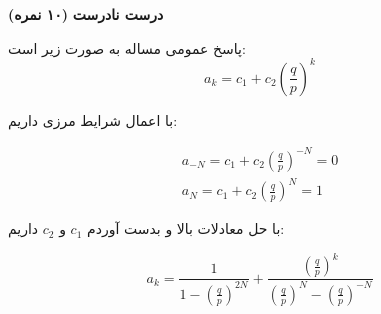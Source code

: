 \Large \textbf{درست نادرست}
\large \textbf{(۱۰ نمره)}

\normalsize \vspace{0.5cm}

پاسخ عمومی مساله به صورت زیر است:
$$
{a_k} = {c_1} + {c_2}{\left( {\frac{q}{p}} \right)^k}
$$

با اعمال شرایط مرزی داریم:

$$
\begin{array}{l}
	{a_{ - N}} = {c_1} + {c_2}{\left( {\frac{q}{p}} \right)^{ - N}} = 0\\
	{a_N} = {c_1} + {c_2}{\left( {\frac{q}{p}} \right)^N} = 1
\end{array}
$$

با حل معادلات بالا و بدست آوردم
${c_1}$
و
${c_2}$
داریم:

$$
{a_k} = \frac{1}{{1 - {{\left( {\frac{q}{p}} \right)}^{2N}}}} + \frac{{{{\left( {\frac{q}{p}} \right)}^k}}}{{{{\left( {\frac{q}{p}} \right)}^N} - {{\left( {\frac{q}{p}} \right)}^{ - N}}}}
$$

